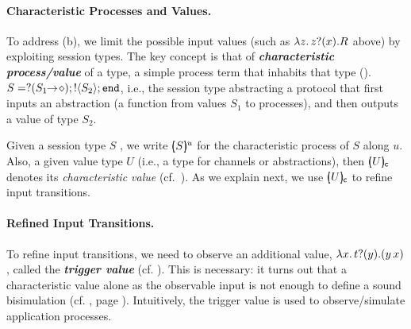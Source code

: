 \paragraph{Characteristic Processes and Values.}
To address (b), we limit the possible 
input values (such as $\lambda z.\,z ? (x) . R$ above) %
by exploiting session types.
The key concept is that of {\bf \emph{characteristic process/value}}
of a type,  
a simple process term that inhabits that type ().
$S = ? (S_1\!\! \rightarrow\! \diamond) ; ! \langle S_2 \rangle ; \mathtt{end}$, i.e.,  the session type abstracting a protocol that 
 first
inputs an abstraction (a function from values $S_1$ to processes), 
and then outputs a value of type $S_2$.


Given a session type $S$ , we write $[\!\!(S)\!\!]^{u} $
for the characteristic process of $S$ along   $u$.
Also, %
a given value type $U$ (i.e., a type for channels or abstractions), then
$[\!\!(U)\!\!]_{\mathsf{c}}$ denotes its \emph{characteristic value} (cf.~).
As we explain next, we use 
$[\!\!(U)\!\!]_{\mathsf{c}}$
 to refine input transitions.

\paragraph{Refined Input Transitions.}
To refine  input transitions, we need to observe 
an additional value, 
$\lambda {x}.\,t ? (y) . (y\, {{x}})$, 
called the {\bf\em trigger value} (cf. ). 
This is necessary: it turns out
that a characteristic value 
alone as the observable input 
is not enough to define a sound bisimulation (cf. , page \pageref{ex:motivation}).
Intuitively, the trigger value is used
to observe/simulate application processes.

